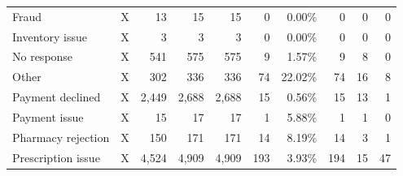 \begin{table}[!htbp]
\begin{tabular}{@{}llrrrrrrrr@{}}
{Fraud} & X & 13 & 15 & 15 & 0 & 0.00\% & 0 & 0 & 0 \\

{Inventory issue} & X & 3 & 3 & 3 & 0 & 0.00\% & 0 & 0 & 0 \\

{No response} & X & 541 & 575 & 575 & 9 & 1.57\% & 9 & 8 & 0 \\

{Other} & X & 302 & 336 & 336 & 74 & 22.02\% & 74 & 16 & 8 \\

{Payment declined} & X & 2,449 & 2,688 & 2,688 & 15 & 0.56\% & 15 & 13 & 1 \\

{Payment issue} & X & 15 & 17 & 17 & 1 & 5.88\% & 1 & 1 & 0 \\

{Pharmacy rejection} & X & 150 & 171 & 171 & 14 & 8.19\% & 14 & 3 & 1 \\

{Prescription issue} & X & 4,524 & 4,909 & 4,909 & 193 & 3.93\% & 194 & 15 & 47 \\


\end{tabular}
\end{table}
